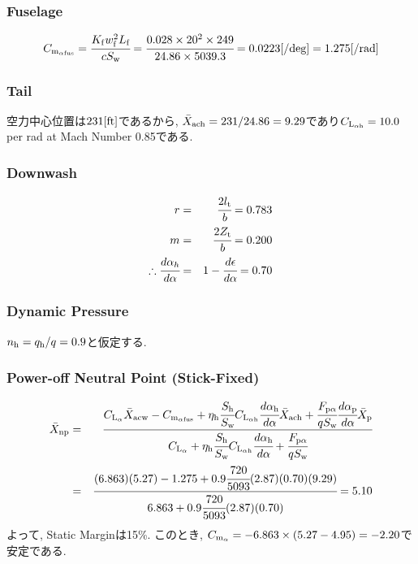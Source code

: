 \documentclass[12pt]{jsarticle}
\begin{document}
\subsubsection*{Fuselage}
\begin{eqnarray*}
C_{\rm m_{\alpha fus}} = \cfrac{K_{\rm f}w_{\rm f}^2 L_{\rm f}}{cS_{\rm w}} = \cfrac{0.028 \times 20^2 \times 249}{24.86 \times 5039.3} = 0.0223 [\rm /deg] = 1.275 [\rm /rad]
\end{eqnarray*}

\subsubsection*{Tail}
空力中心位置は$231[\rm ft]$であるから, $\bar{X}_{\rm ach} = 231/24.86 = 9.29$であり$C_{\rm L_{\alpha h}} = 10.0$ per rad at Mach Number 0.85である.

\subsubsection*{Downwash}
\begin{eqnarray*}
r &=& \cfrac{2l_{\rm t}}{b} = 0.783 \\
m &=& \cfrac{2Z_{\rm t}}{b} = 0.200 \\
\therefore \cfrac{d\alpha_h}{d\alpha} &=& 1 - \cfrac{d\epsilon}{d\alpha} = 0.70
\end{eqnarray*}

\subsubsection*{Dynamic Pressure}
$n_{\rm h} = q_{\rm h}/q = 0.9$と仮定する.

\subsubsection*{Power-off Neutral Point (Stick-Fixed)}
\begin{eqnarray*}
\bar{X}_{\rm np} &=& \cfrac{C_{\rm L_{\alpha}}\bar{X}_{\rm acw} - C_{\rm m_{\alpha fus}} + \eta_{\rm h}\cfrac{S_{\rm h}}{S_{\rm w}}C_{\rm L_{\alpha h}}\cfrac{d\alpha_{\rm h}}{d\alpha}\bar{X}_{\rm ach} + \cfrac{F_{\rm p\alpha}}{qS_{\rm w}}\cfrac{d\alpha_{\rm p}}{d\alpha} \bar{X}_{\rm p}}{C_{\rm L_{\alpha}} + \eta_{\rm h}\cfrac{S_{\rm h}}{S_{\rm w}}C_{\rm L_{\alpha h}}\cfrac{d\alpha_{\rm h}}{d\alpha}+\cfrac{F_{\rm p\alpha}}{qS_{\rm w}}} \\
&=& \cfrac{(6.863)(5.27) - 1.275 + 0.9\cfrac{720}{5093}(2.87)(0.70)(9.29)}{6.863+0.9\cfrac{720}{5093}(2.87)(0.70)} = 5.10
\end{eqnarray*}
よって, Static Marginは15\%. このとき, $C_{\rm m_{\alpha}} = -6.863\times (5.27 - 4.95) = -2.20$で安定である.
\end{document}
